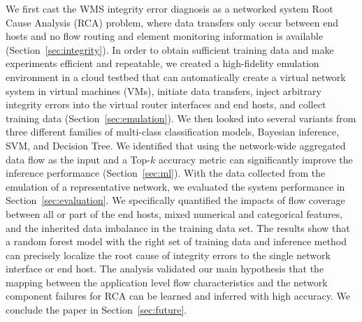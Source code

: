 We first cast the WMS integrity error diagnosis as a networked system Root Cause Analysis (RCA) problem, where data transfers only occur between end hosts and no flow routing and element monitoring information is available (Section~\ref{sec:integrity}).  In order to obtain sufficient training data and make experiments efficient and repeatable, we created a high-fidelity emulation environment in a cloud testbed that can automatically create a virtual network system in virtual machines (VMs), initiate data transfers, inject arbitrary integrity errors into the virtual router interfaces and end hosts, and collect training data (Section~\ref{sec:emulation}). We then looked into several variants from three different families of multi-class classification models, Bayesian inference, SVM, and Decision Tree. We identified that using the network-wide aggregated data flow as the input and a Top-$k$ accuracy metric can significantly improve the inference performance (Section~\ref{sec:ml}). With the data collected from the emulation of a representative network, we evaluated the system performance in Section~\ref{sec:evaluation}. We specifically quantified the impacts of flow coverage between all or part of the end hosts, mixed numerical and categorical features, and the inherited data imbalance in the training data set. The results show that a random forest model with the right set of training data and inference method can precisely localize the root cause of integrity errors to the single network interface or end host. The analysis validated our main hypothesis that the mapping between the application level flow characteristics and the network component failures for RCA can be learned and inferred with high accuracy. We conclude the paper in Section~\ref{sec:future}.
